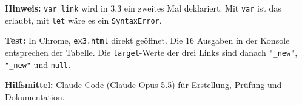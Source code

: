 \documentclass[11pt,a4paper]{article}
\begin{document}
\medskip
\textbf{Hinweis:} \texttt{var link} wird in 3.3 ein zweites Mal
deklariert. Mit \texttt{var} ist das erlaubt, mit \texttt{let} wäre es
ein \texttt{SyntaxError}.

\medskip
\textbf{Test:} In Chrome, \texttt{ex3.html} direkt geöffnet. Die 16
Ausgaben in der Konsole entsprechen der Tabelle. Die \texttt{target}-Werte
der drei Links sind danach \texttt{"\_new"}, \texttt{"\_new"} und
\texttt{null}.

\medskip
{\small \textbf{Hilfsmittel:} Claude Code (Claude Opus 5.5) für Erstellung, Prüfung und Dokumentation.}
\end{document}

